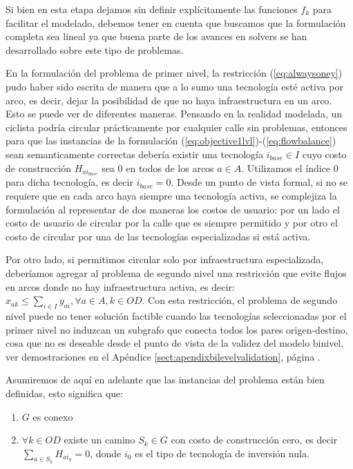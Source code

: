
Si bien en esta etapa dejamos sin definir explícitamente las funciones $f_k$ para facilitar el modelado, debemos tener en cuenta que buscamos que la formulación completa sea lineal ya que buena parte de los avances en solvers se han desarrollado sobre este tipo de problemas.

En la formulación del problema de primer nivel, la restricción (\ref{eq:alwaysoney}) pudo haber sido escrita de manera que a lo sumo una tecnología esté activa por arco, es decir, dejar la posibilidad de que no haya infraestructura en un arco. Esto se puede ver de diferentes maneras. Pensando en la realidad modelada, un ciclista podría circular prácticamente por cualquier calle sin problemas, entonces para que las instancias de la formulación (\ref{eq:objective1lvl})-(\ref{eq:flowbalance}) sean semanticamente correctas debería existir una tecnología $i_{base} \in I$ cuyo costo de construcción $H_{ai_{base}}$ sea 0 en todos de los arcos $a \in A$. Utilizamos el índice 0 para dicha tecnología, es decir $i_{base} = 0$. Desde un punto de vista formal, si no se requiere que en cada arco haya siempre una tecnología activa, se complejiza la formulación al representar de dos maneras los costos de usuario: por un lado el costo de usuario de circular por la calle que es siempre permitido y por otro el costo de circular por una de las tecnologías especializadas si está activa.

Por otro lado, si permitimos circular solo por infraestructura especializada, deberíamos agregar al problema de segundo nivel una restricción que evite flujos en arcos donde no hay infraestructura activa, es decir: $x_{ak} \leq \sum_{i \in I} y_{ai}, \forall a \in A, k \in OD$. Con esta restricción, el problema de segundo nivel puede no tener solución factible cuando las tecnologías seleccionadas por el primer nivel no induzcan un subgrafo que conecta todos los pares origen-destino, cosa que no es deseable desde el punto de vista de la validez del modelo binivel, ver demostraciones en el Apéndice \ref{sect:apendixbilevelvalidation}, página \pageref{sect:apendixbilevelvalidation}.

Asumiremos de aquí en adelante que las instancias del problema están bien definidas, esto significa que:

\begin{enumerate}
  \item {$G$ es conexo}
  \item {$\forall k \in OD$ existe un camino $S_k \in G$ con costo de construcción cero, es decir $\sum_{a \in S_k} H_{ai_0} = 0$}, donde $i_0$ es el tipo de tecnología de inversión nula.
\end{enumerate}

